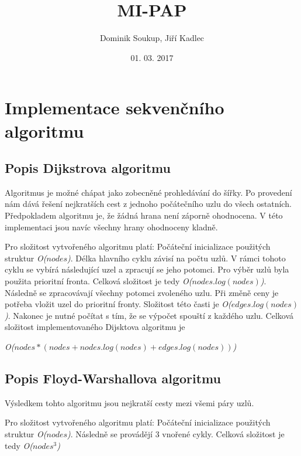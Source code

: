 \documentclass[a4paper,11pt]{article}
\title{\textbf{MI-PAP}}
\author{Dominik Soukup, Jiří Kadlec}
\date{01. 03. 2017}
\begin{document}
\maketitle
\thispagestyle{empty}
\newpage
\tableofcontents
\thispagestyle{empty}
\newpage

\section{Implementace sekvenčního algoritmu}

\subsection{Popis Dijkstrova algoritmu}
Algoritmus je možné chápat jako zobecněné prohledávání do šířky. Po provedení nám dává řešení nejkratších
cest z jednoho počátečního uzlu do všech ostatních. Předpokladem algoritmu je, že žádná hrana není záporně
ohodnocena. V této implementaci jsou navíc všechny hrany ohodnoceny kladně.

Pro složitost vytvořeného algoritmu platí:
Počáteční inicializace použitých struktur \textit{O(${nodes}$)}. Délka hlavního cyklu závisí na počtu uzlů.
V rámci tohoto cyklu se vybírá následující uzel a zpracují se jeho potomci. Pro výběr uzlů byla použita
prioritní fronta. Celková složitost je tedy  \textit{O(${nodes . log(nodes)}$)}.
Následně se zpracovávají všechny potomci zvoleného uzlu. Při změně ceny je potřeba vložit uzel do prioritní
fronty. Složitost této časti je \textit{O(${edges . log(nodes)}$)}. Nakonec je nutné počítat s tím, 
že se výpočet spouští z každého uzlu. 
Celková složitost implementovaného Dijsktova algoritmu je\-

\textit{O(${nodes*(nodes+nodes . log(nodes)+edges . log(nodes))}$)}

\subsection{Popis Floyd-Warshallova algoritmu}
Výsledkem tohto algoritmu jsou nejkratší cesty mezi všemi páry uzlů.

Pro složitost vytvořeného algoritmu platí:
Počáteční inicializace použitých struktur \textit{O(${nodes}$)}. Následně se provádějí 3 vnořené cykly.
Celková složitost je tedy \textit{O(${nodes^3}$)}
\end{document}
